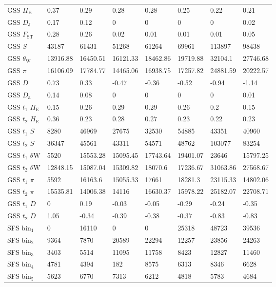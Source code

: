 \documentclass[a4paper, 12pt]{article}
\begin{document}
\begin{tiny}
\begin{longtable}{p{3.0cm}p{1.0cm}p{1.0cm}p{1.0cm}p{1.0cm}p{1.0cm}p{1.0cm}p{1.0cm}}
GSS $H_{\mathrm{E}}$ & 0.37 & 0.29 & 0.28 & 0.28 & 0.25 & 0.22 & 0.21 \\
GSS $D_{\mathrm{J}}$ & 0.17 & 0.12 & 0 & 0 & 0 & 0 & 0.02 \\
GSS $F_{\mathrm{ST}}$ & 0.28 & 0.26 & 0.02 & 0.01 & 0.01 & 0.01 & 0.05 \\
GSS $S$ & 43187 & 61431 & 51268 & 61264 & 69961 & 113897 & 98438 \\
GSS $\theta_{\mathrm{W}}$ & 13916.88 & 16450.51 & 16121.33 & 18462.86 & 19719.88 & 32104.1 & 27746.68 \\
GSS $\pi$ & 16106.09 & 17784.77 & 14465.06 & 16938.75 & 17257.82 & 24881.59 & 20222.57 \\
GSS $D$ & 0.73 & 0.33 & -0.47 & -0.36 & -0.52 & -0.94 & -1.14 \\
GSS $D_{\mathrm{a}}$ & 0.14 & 0.08 & 0 & 0 & 0 & 0 & 0.01 \\
GSS $t_1$ $H_{\mathrm{E}}$ & 0.15 & 0.26 & 0.29 & 0.29 & 0.26 & 0.2 & 0.15 \\
GSS $t_2$ $H_{\mathrm{E}}$ & 0.36 & 0.23 & 0.28 & 0.27 & 0.23 & 0.22 & 0.23 \\
GSS $t_1$ $S$ & 8280 & 46969 & 27675 & 32530 & 54885 & 43351 & 40960 \\
GSS $t_2$ $S$ & 36347 & 45561 & 43311 & 54571 & 48762 & 103077 & 83254 \\
GSS $t_1$ $\theta{\mathrm{W}}$ & 5520 & 15553.28 & 15095.45 & 17743.64 & 19401.07 & 23646 & 15797.25 \\
GSS $t_2$ $\theta{\mathrm{W}}$ & 12848.15 & 15087.04 & 15309.82 & 18070.6 & 17236.67 & 31063.86 & 27568.67 \\
GSS $t_1$ $\pi$  & 5592 & 16163.6 & 15055.33 & 17661 & 18281.3 & 23115.33 & 14802.06 \\
GSS $t_2$ $\pi$  & 15535.81 & 14006.38 & 14116 & 16630.37 & 15978.22 & 25182.07 & 22708.71 \\
GSS $t_1$ $D$ & 0 & 0.19 & -0.03 & -0.05 & -0.29 & -0.24 & -0.35 \\
GSS $t_2$ $D$  & 1.05 & -0.34 & -0.39 & -0.38 & -0.37 & -0.83 & -0.83 \\
SFS bin$_1$ & 0 & 16110 & 0 & 0 & 25318 & 48723 & 39536 \\
SFS bin$_2$ & 9364 & 7870 & 20589 & 22294 & 12257 & 23856 & 24263 \\
SFS bin$_3$ & 3403 & 5514 & 11095 & 11758 & 8423 & 12827 & 11460 \\
SFS bin$_4$ & 4781 & 4394 & 182 & 8575 & 6313 & 8346 & 6628 \\
SFS bin$_5$ & 5623 & 6770 & 7313 & 6212 & 4818 & 5783 & 4684 \\

\end{longtable}
\end{tiny}
\end{document}
